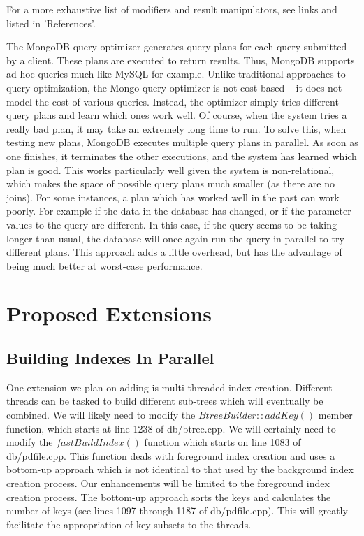 \documentclass{dependencies/acm_proc_article-sp}
\begin{document}
For a more exhaustive list of modifiers and result manipulators, see links\cite{11} and\cite{12} listed in 'References'.

The MongoDB query optimizer generates query plans for each query submitted by a client.
These plans are executed to return results.
Thus, MongoDB supports ad hoc queries much like MySQL for example.
Unlike traditional approaches to query optimization, the Mongo query optimizer is not cost based -- it does not model the cost of various queries.
Instead, the optimizer simply tries different query plans and learn which ones work well.
Of course, when the system tries a really bad plan, it may take an extremely long time to run.
To solve this, when testing new plans, MongoDB executes multiple query plans in parallel.
As soon as one finishes, it terminates the other executions, and the system has learned which plan is good.
This works particularly well given the system is non-relational, which makes the space of possible query plans much smaller (as there are no joins).
For some instances, a plan which has worked well in the past can work poorly.
For example if the data in the database has changed, or if the parameter values to the query are different.
In this case, if the query seems to be taking longer than usual, the database will once again run the query in parallel to try different plans.
This approach adds a little overhead, but has the advantage of being much better at worst-case performance\cite{13}.
\section{Proposed Extensions}
\subsection{Building Indexes In Parallel}
One extension we plan on adding is multi-threaded index creation.
Different threads can be tasked to build different sub-trees which will eventually be combined.
We will likely need to modify the $BtreeBuilder::addKey()$ member function, which starts at line 1238 of db/btree.cpp.  We will certainly need to modify the $fastBuildIndex()$ function which starts on line 1083 of db/pdfile.cpp.  This function deals with foreground index creation and uses a bottom-up approach which is not identical to that used by the background index creation process\cite{17}.  Our enhancements will be limited to the foreground index creation process.  The bottom-up approach sorts the keys and calculates the number of keys (see lines 1097 through 1187 of db/pdfile.cpp).  This will greatly facilitate the appropriation of key subsets to the threads. 
\end{document}
